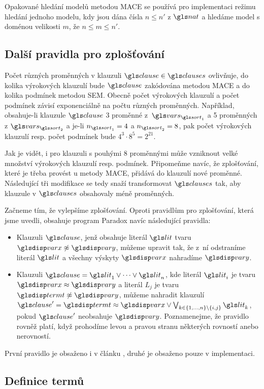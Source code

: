 Opakované hledání modelů metodou MACE se používá pro implementaci
režimu hledání jednoho modelu,
kdy jsou dána čísla $n \leq n'$ z $\nat$ a hledáme
model s doménou velikosti $m$, že $n \leq m \leq n'$.

\subsection{Další pravidla pro zplošťování} \label{sec:flatten-extended}

Počet různých proměnných v klauzuli $\clause \in \clauses$
ovlivňuje, do kolika výrokových klauzulí bude $\clause$
zakódována metodou MACE a do kolika podmínek metodou SEM.
Obecně počet výrokových klauzulí a počet podmínek
závisí exponenciálně na počtu různých proměnných.
Například, obsahuje-li klauzule $\clause$ 3 proměnné z~$\vars_{\sort_1}$
a 5 proměnných z $\vars_{\sort_2}$ a je-li $n_{\sort_1} = 4$
a $n_{\sort_2} = 8$, pak počet výrokových klauzulí resp. počet podmínek
bude $4^3 \cdot 8^5 = 2^{21}$.

Jak je vidět, i pro klauzuli s pouhými 8 proměnnými může vzniknout
velké množství výrokových klauzulí resp. podmínek.
Připomeňme navíc, že zplošťování, které je třeba
provést u metody MACE, přidává do klauzulí nové proměnné.
Následující tři modifikace se tedy snaží transformovat
$\clauses$ tak, aby klauzule v $\clauses$ obsahovaly méně proměnných.

Začneme tím, že vylepšíme zplošťování. Oproti pravidlům
pro zplošťování, která jsme uvedli, obsahuje program Paradox \cite{paradox}
navíc následující pravidla:
\begin{itemize}
\item Klauzuli $\clause$, jenž obsahuje literál $\lit$ tvaru
  $\var \not\approx \varY$, můžeme upravit tak,
  že z~ní odstraníme literál $\lit$ a všechny výskyty
  $\var$ nahradíme $\varY$.
\item Klauzuli $\clause = \lit_1 \vee \cdots \vee \lit_n$, kde literál
  $\lit_i$ je tvaru $\var \approx \varY$ a literál $L_j$ je tvaru
  $\term \not\approx \varY$, můžeme nahradit klauzulí
  $\clause' = \term \approx \var \vee
  \bigvee_{k \in \{ 1 \comdots n \} \setminus \{ i, j \}} \lit_k$, pokud $\clause'$
  neobsahuje $\varY$. Poznamenejme, že pravidlo rovněž platí,
  když prohodíme levou a pravou stranu některých rovností anebo nerovností.
\end{itemize}
První pravidlo je obsaženo i v článku \cite{claessen03paradox},
druhé je obsaženo pouze v implementaci.

\subsection{Definice termů}

